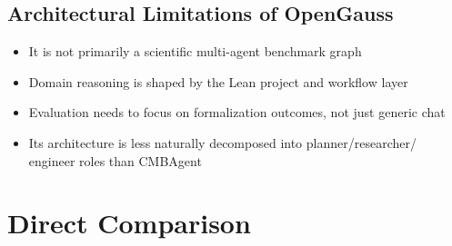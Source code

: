 \documentclass[11pt,a4paper]{article}
\begin{document}
\subsection{Architectural Limitations of OpenGauss}
\begin{itemize}[leftmargin=1.5em]
\item It is not primarily a scientific multi-agent benchmark graph
\item Domain reasoning is shaped by the Lean project and workflow layer
\item Evaluation needs to focus on formalization outcomes, not just generic chat
\item Its architecture is less naturally decomposed into planner/researcher/
engineer roles than CMBAgent
\end{itemize}

\section{Direct Comparison}
\end{document}
